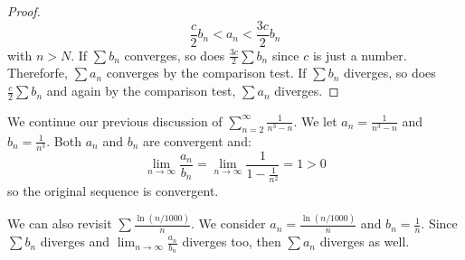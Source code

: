\begin{itemize}
\begin{proof}
        \begin{equation}
            \frac{c}{2}b_n < a_n < \frac{3c}{2}b_n
        \end{equation}
        with $n>N$. If $\sum b_n$ converges, so does $\frac{3c}{2}\sum b_n$ since $c$ is just a number. Thereforfe, $\sum a_n$ converges by the comparison test. If $\sum b_n$ diverges, so does $\frac{c}{2}\sum b_n$ and again by the comparison test, $\sum a_n$ diverges.
    \end{proof}
    \begin{example}
        We continue our previous discussion of $\sum_{n=2}^\infty \frac{1}{n^3-n}$. We let $a_n = \frac{1}{n^3-n}$ and $b_n= \frac{1}{n^3}$. Both $a_n$ and $b_n$ are convergent and:
        \begin{equation}
            \lim_{n\to\infty} \frac{a_n}{b_n} = \lim_{n\to\infty} \frac{1}{1-\frac{1}{n^2}}=1 > 0
        \end{equation}
        so the original sequence is convergent.
    \end{example}
    \begin{example}
        We can also revisit $\sum \frac{\ln(n/1000)}{n}$. We consider $a_n = \frac{\ln(n/1000)}{n}$ and $b_n=\frac{1}{n}$. Since $\sum b_n$ diverges and $\lim_{n\to\infty} \frac{a_n}{b_n}$ diverges too, then $\sum a_n$ diverges as well.
    \end{example}
\end{itemize}